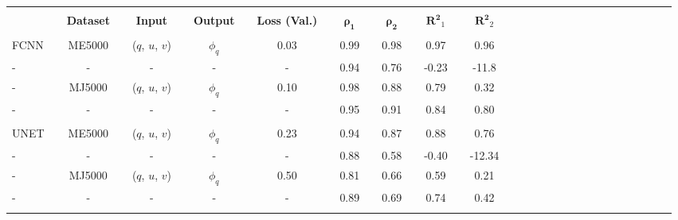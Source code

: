 \bgroup
\def\arraystretch{1.5}
\begin{table}[H]
\hspace{-0.85cm}
\begin{tabular}{llclclclclclclclclclclclclclclcl}
\Xhline{1.5pt}\\[-1.5em]
\textbf{} &  & \textbf{Dataset} &  & \textbf{Input} &  & \textbf{Output} &  & \textbf{Loss (Val.)} &  & $\boldsymbol{\rho_{1}}$ &  & $\boldsymbol{\rho_{2}}$ &  & $\boldsymbol{R^2}_1$ &  & $\boldsymbol{R^2}_2$ \\[0.4em] 
\cline{1-1} \cline{3-3} \cline{5-5} \cline{7-7} \cline{9-9} \cline{11-11} \cline{13-13} \cline{15-15} \cline{17-17} \\[-1.4em]
FCNN        &  & ME5000           &  & ($q$, $u$, $v$)  &  & $\phi_q$ &  & 0.03                 &  & 0.99             &  & 0.98             &  & 0.97            &  & 0.96            \\ \rowcolor{Gray}
-     		&  & -                &  & -				&  & -        &  & -                     &  & 0.94             &  & 0.76             &  & -0.23            &  & -11.8             \\ 
-     		&  & MJ5000           &  & ($q$, $u$, $v$)  &  & $\phi_q$ &  & 0.10                 &  & 0.98             &  & 0.88             &  & 0.79            &  & 0.32            \\ \rowcolor{Gray}
-     		&  & -                &  & -				&  & -        &  & -                     &  & 0.95             &  & 0.91             &  & 0.84            &  & 0.80            \\ 
\hline \\[-1.4em]
UNET        &  & ME5000           &  & ($q$, $u$, $v$)  &  & $\phi_q$ &  & 0.23                 &  & 0.94             &  & 0.87             &  & 0.88            &  & 0.76            \\ \rowcolor{Gray}
-     		&  & -                &  & -				&  & -        &  & -                     &  & 0.88             &  & 0.58             &  & -0.40            &  & -12.34             \\ 
-     		&  & MJ5000            &  & ($q$, $u$, $v$)  &  & $\phi_q$ &  & 0.50                 &  & 0.81             &  & 0.66             &  & 0.59            &  & 0.21            \\ \rowcolor{Gray}
-     		&  & -                &  & -				&  & -        &  & -                     &  & 0.89             &  & 0.69             &  & 0.74            &  & 0.42            \\ 
\hline \\[-1.4em]

\end{tabular}
\end{table}
